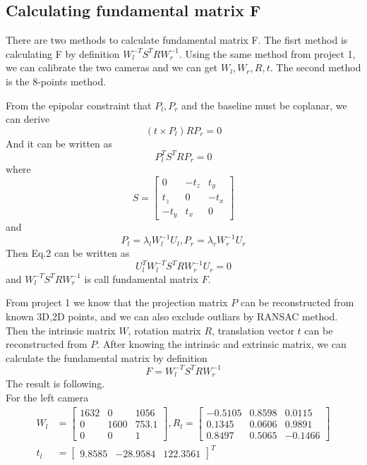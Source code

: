 \documentclass{article}
\begin{document}
\subsection*{Calculating fundamental matrix F}
\par
There are two methods to calculate fundamental matrix F. The fisrt method is calculating F by definition $W_l^{-T}S^TRW_r^{-1}$. Using the same method from project 1, we can calibrate the two cameras and we can get $W_l,W_r,R,t$. The second method is the 8-points method.
\par
From the epipolar constraint that $P_l,P_r$ and the baseline must be coplanar, we can derive 
\begin{equation}
(t\times P_l)RP_r = 0
\end{equation}
And it can be written as
\begin{equation}
P_l^TS^TRP_r = 0
\end{equation}
where 
\begin{equation}
S = \begin{bmatrix}
0&-t_z&t_y\\
t_z&0&-t_x\\
-t_y&t_x&0
\end{bmatrix}
\end{equation}
and 
\begin{equation}
P_l = \lambda_lW_l^{-1}U_l,
P_r = \lambda_rW_r^{-1}U_r
\end{equation}
Then Eq.2 can be written as
\begin{equation}
U_l^TW_l^{-T}S^TRW_r^{-1}U_r=0
\end{equation}
and $W_l^{-T}S^TRW_r^{-1}$ is call fundamental matrix $F$.
\par
From project 1 we know that the projection matrix $P$ can be reconstructed from known 3D,2D points, and we can also exclude outliars by RANSAC method. Then the intrinsic matrix $W$, rotation matrix $R$, translation vector $t$ can be reconstructed from $P$. After knowing the intrinsic and extrinsic matrix, we can calculate the fundamental matrix by definition
\begin{equation}
F = W_l^{-T}S^TRW_r^{-1}
\end{equation}
The result is following.\\
For the left camera
\begin{align*}
W_l &= \begin{bmatrix}
1632&0&1056\\0&1600&753.1\\0&0&1
\end{bmatrix},
R_l = \begin{bmatrix}
-0.5105&0.8598&0.0115\\
0.1345&0.0606&0.9891\\
0.8497&0.5065&-0.1466
\end{bmatrix}
\\
t_l &= \begin{bmatrix}
9.8585&-28.9584&122.3561
\end{bmatrix}^T
\end{align*}
\end{document}
